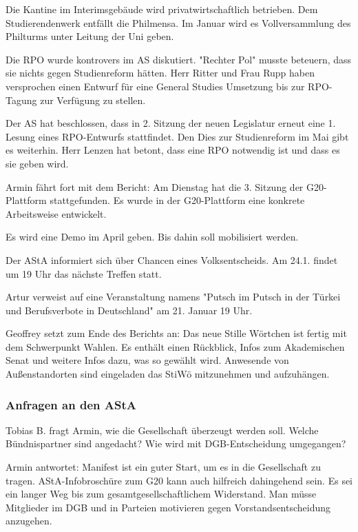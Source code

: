 \documentclass[ngerman,headheight=70pt]{scrartcl}
\begin{document}
    Die Kantine im Interimsgebäude wird privatwirtschaftlich betrieben. Dem
    Studierendenwerk entfällt die Philmensa. Im Januar wird es Vollversammlung
    des Philturms unter Leitung der Uni geben.

    Die RPO wurde kontrovers im AS diskutiert. "Rechter Pol" musste beteuern,
    dass sie nichts gegen Studienreform hätten. Herr Ritter und Frau Rupp haben
    versprochen einen Entwurf für eine General Studies Umsetzung bis zur RPO-Tagung
    zur Verfügung zu stellen.

    Der AS hat beschlossen, dass in 2. Sitzung der neuen Legislatur erneut eine 1.
    Lesung eines RPO-Entwurfs stattfindet. Den Dies zur Studienreform im Mai gibt
    es weiterhin. Herr Lenzen hat betont, dass eine RPO notwendig ist und dass es sie
    geben wird.

    Armin fährt fort mit dem Bericht:
    Am Dienstag hat die 3. Sitzung der G20-Plattform stattgefunden. Es wurde
    in der G20-Plattform eine konkrete Arbeitsweise entwickelt.

    Es wird eine Demo im April geben. Bis dahin soll mobilisiert werden.

    Der AStA informiert sich über Chancen eines Volksentscheids. Am 24.1. findet
    um 19 Uhr das nächste Treffen statt.

    Artur verweist auf eine Veranstaltung namens "Putsch im Putsch in der Türkei
    und Berufsverbote in Deutschland" am 21. Januar 19 Uhr.

    Geoffrey setzt zum Ende des Berichts an:
    Das neue Stille Wörtchen ist fertig mit dem Schwerpunkt Wahlen. Es enthält
    einen Rückblick, Infos zum Akademischen Senat und weitere Infos dazu, was so
    gewählt wird. Anwesende von Außenstandorten sind eingeladen das StiWö
    mitzunehmen und aufzuhängen.

    \subsubsection{Anfragen an den AStA}

    Tobias B. fragt Armin, wie die Gesellschaft überzeugt werden soll.
    Welche Bündnispartner sind angedacht? Wie wird mit DGB-Entscheidung umgegangen?

    Armin antwortet:
    Manifest ist ein guter Start, um es in die Gesellschaft zu tragen.
    AStA-Infobroschüre zum G20 kann auch hilfreich dahingehend sein. Es sei ein
    langer Weg bis zum gesamtgesellschaftlichem Widerstand. Man müsse Mitglieder
    im DGB und in Parteien motivieren gegen Vorstandsentscheidung anzugehen.
\end{document}
